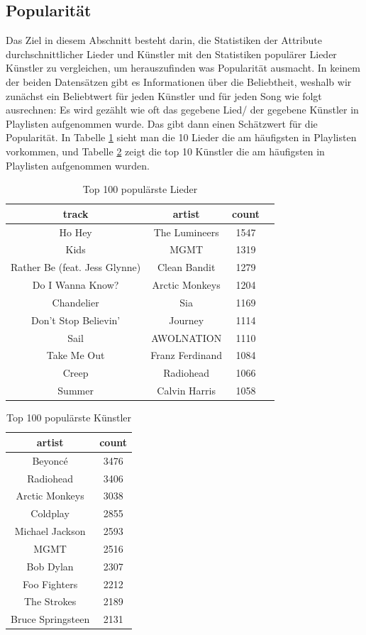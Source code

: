 \documentclass[conference]{IEEEtran}
\begin{document}
\subsection{Popularität}
Das Ziel in diesem Abschnitt besteht darin, die Statistiken der Attribute durchschnittlicher Lieder und Künstler mit den Statistiken populärer Lieder Künstler zu vergleichen, um herauszufinden was Popularität ausmacht.
In keinem der beiden Datensätzen gibt es Informationen über die Beliebtheit, weshalb wir zunächst ein Beliebtwert für jeden Künstler und für jeden Song wie folgt ausrechnen: Es wird gezählt wie oft das gegebene Lied/ der gegebene Künstler in Playlisten aufgenommen wurde. Das gibt dann einen Schätzwert für die Popularität. 
In Tabelle \ref{tab:topsongs} sieht man die 10 Lieder die am häufigsten in Playlisten vorkommen, und Tabelle \ref{tab:topartists} zeigt die top 10 Künstler die am häufigsten in Playlisten aufgenommen wurden.

\begin{table}[h]
\centering
\begin{tabular}{c c c c} 
\hline
track & artist & count \\ [0.5ex] 
\hline
Ho Hey & The Lumineers & 1547 \\ 
Kids & MGMT & 1319 \\ 
Rather Be (feat. Jess Glynne) & Clean Bandit & 1279 \\ 
Do I Wanna Know? & Arctic Monkeys & 1204 \\ 
Chandelier & Sia & 1169 \\ 
Don't Stop Believin' & Journey & 1114 \\ 
Sail & AWOLNATION & 1110 \\ 
Take Me Out & Franz Ferdinand & 1084 \\ 
Creep & Radiohead & 1066 \\ 
Summer & Calvin Harris & 1058 \\ [1ex] 
\hline
\end{tabular}

\caption{Top 100 populärste Lieder}
\label{tab:topsongs}
\end{table}

\begin{table}[h]
\centering
\begin{tabular}{c c} 
\hline
artist & count \\ [0.5ex] 
\hline
Beyoncé & 3476 \\ 
Radiohead & 3406 \\ 
Arctic Monkeys & 3038 \\ 
Coldplay & 2855 \\ 
Michael Jackson & 2593 \\ 
MGMT & 2516 \\ 
Bob Dylan & 2307 \\ 
Foo Fighters & 2212 \\ 
The Strokes & 2189 \\ 
Bruce Springsteen & 2131 \\ [1ex] 
\hline
\end{tabular}
\caption{Top 100 populärste Künstler}
\label{tab:topartists}
\end{table}
\end{document}
